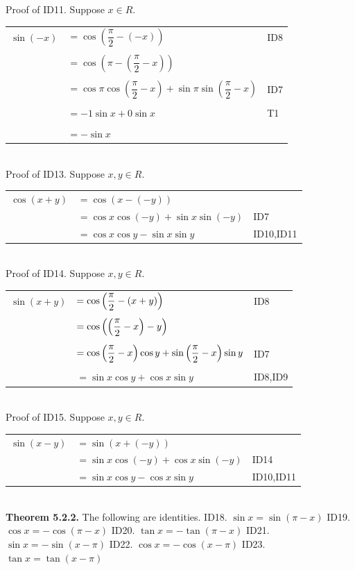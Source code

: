 Proof of ID11. Suppose $x\in R.$ \nl
\begin{tabular}{r l l}
$\sin (-x)$&$=\cos\left(\dfrac{\pi}{2} - (-x)\right)$&ID8 \\
&&\\
&$=\cos\left(\pi - \left(\dfrac{\pi}{2}- x\right)\right)$&\\
&&\\
&$= \cos \pi \cos \left(\dfrac{\pi}{2} - x\right) + \sin \pi \sin\left(\dfrac{\pi}{2} - x\right)$&ID7\\
&&\\
&$=-1\sin x + 0\sin x$&T1\\
&&\\
&$=-\sin x$& \\
\end{tabular}\\
Proof of ID13. Suppose $x,y\in R.$ \nl
\begin{tabular}{r l l}
$\cos(x+y)$&$= \cos(x-(-y))$&\\
&$=\cos x\cos(-y) + \sin x\sin(-y)$&ID7\\
&$=\cos x\cos y - \sin x\sin y$&ID10,ID11\\
\end{tabular}\\


Proof of ID14. Suppose $x,y\in R.$\nl
\begin{tabular}{r l l}
$\sin (x + y)$&$=\cos \left(\dfrac{\pi}{2} - (x + y)\right)$&ID8\\
&&\\
&$=\cos \left(\left(\dfrac{\pi}{2} - x\right) - y\right) $&\\
&&\\
&$=\cos \left( \dfrac{\pi}{2} - x \right)\cos y + \sin\left(\dfrac{\pi}{2} - x\right)\sin y $&ID7\\
&&\\
&$=\sin x \cos y + \cos x \sin y$&ID8,ID9\\
\end{tabular} \\

Proof of ID15. Suppose $x,y\in R.$ \nl
\begin{tabular}{r l l}
$\sin(x-y)$&$= \sin(x+(-y))$& \\
&$= \sin x \cos(-y) + \cos x \sin(-y)$&ID14\\
&$= \sin x \cos y - \cos x \sin y$&ID10,ID11\\
\end{tabular}\\

\textbf{Theorem 5.2.2.} The following are identities. \nl
ID18. $\sin x = \sin( \pi-x)$\nl
ID19. $\cos x = -\cos (\pi -x)$\nl
ID20. $\tan x = -\tan(\pi -x )$\nl
ID21. $\sin x = -\sin(x - \pi)$\nl
ID22. $\cos x = -\cos(x - \pi)$\nl
ID23. $\tan x = \tan(x - \pi)$\nl

